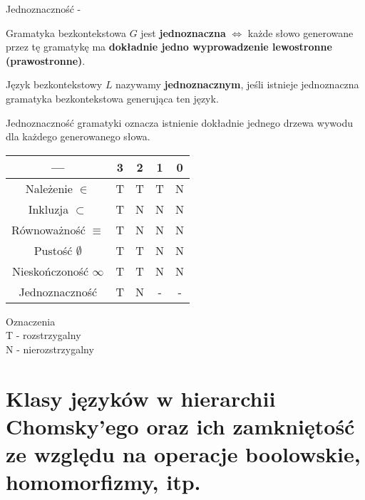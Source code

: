 \documentclass[main.tex]{subfiles}
\begin{document}
    \begin{definition}
        Jednoznaczność -

        Gramatyka bezkontekstowa $G$ jest \textbf{jednoznaczna} $\Leftrightarrow$ każde słowo generowane przez tę gramatykę ma \textbf{dokładnie jedno wyprowadzenie lewostronne (prawostronne)}.

        Język bezkontekstowy $L$ nazywamy \textbf{jednoznacznym}, jeśli istnieje jednoznaczna gramatyka bezkontekstowa generująca ten język.

        Jednoznaczność gramatyki oznacza istnienie dokładnie jednego drzewa wywodu dla każdego generowanego słowa.
    \end{definition}


    \begin{center}
        \begin{tabular}{||c c c c c||}
            \hline
            --- & 3 & 2 & 1 & 0 \\ [0.5ex]
            \hline\hline
            Należenie $\in$ & T & T & T & N \\
            \hline
            Inkluzja $\subset$ & T & N & N & N \\
            \hline
            Równoważność $\equiv$ & T & N & N & N \\
            \hline
            Pustość $\emptyset$ & T & T & N & N \\
            \hline
            Nieskończoność $\infty$ & T & T & N & N \\
            \hline
            Jednoznaczność & T & N & - & - \\ [1ex]
            \hline
        \end{tabular}
    \end{center}

    Oznaczenia\\
    T - rozstrzygalny\\
    N - nierozstrzygalny

    \newpage


    \section{Klasy języków w hierarchii Chomsky’ego oraz ich zamkniętość ze względu na operacje boolowskie, homomorfizmy, itp.}
\end{document}
